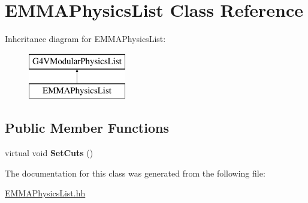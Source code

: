 \hypertarget{classEMMAPhysicsList}{\section{E\-M\-M\-A\-Physics\-List Class Reference}
\label{classEMMAPhysicsList}
}
Inheritance diagram for E\-M\-M\-A\-Physics\-List\-:\begin{figure}[H]
\begin{center}
\leavevmode
\includegraphics[height=2.000000cm]{classEMMAPhysicsList}
\end{center}
\end{figure}
\subsection*{Public Member Functions}
\begin{DoxyCompactItemize}
\item 
\hypertarget{classEMMAPhysicsList_ab1fbea92bd79dc73b900a2ad09b4081b}{virtual void {\bfseries Set\-Cuts} ()}\label{classEMMAPhysicsList_ab1fbea92bd79dc73b900a2ad09b4081b}

\end{DoxyCompactItemize}


The documentation for this class was generated from the following file\-:\begin{DoxyCompactItemize}
\item 
\hyperlink{EMMAPhysicsList_8hh}{E\-M\-M\-A\-Physics\-List.\-hh}\end{DoxyCompactItemize}
